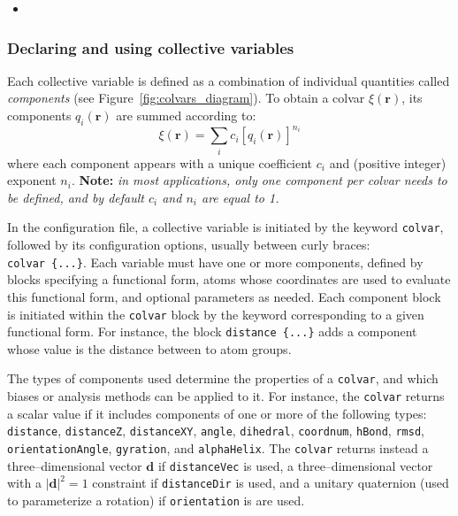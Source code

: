 \begin{itemize}
\item %

\end{itemize}



\subsubsection{Declaring and using collective variables}
\label{sec:colvar}

Each collective variable is defined as a combination of
individual quantities called \emph{components}
(see Figure~\ref{fig:colvars_diagram}). To obtain a colvar $\xi(\mathbf{r})$,
its components $q_i(\mathbf{r})$ are summed according to:
\begin{equation}
  \label{eq:colvar_combination}
  \xi(\mathbf{r}) = \sum_i c_i [q_i(\mathbf{r})]^{n_i}
\end{equation}
where each component appears with a unique coefficient $c_i$ and
(positive integer) exponent $n_i$.  \textbf{Note:} \emph{in most
  applications, only one component per colvar needs to be defined, and
  by default $c_i$ and $n_i$ are equal to 1.}

In the configuration file, a collective variable is initiated
by the keyword \texttt{colvar},
followed by its configuration options, usually between curly braces:
\texttt{colvar~\{...\}}. Each variable must
have one or more components, defined by blocks specifying a
functional form, atoms whose coordinates are used to evaluate
this functional form, and optional parameters as needed. Each
component block is initiated within the \texttt{colvar} block by the
keyword corresponding to a given functional form.  For instance, the
block \texttt{distance \{...\}} adds a component whose value is
the distance between to atom groups.

The types of components used determine the properties of a
\texttt{colvar}, and which biases or analysis methods can be applied
to it.  For instance, the \texttt{colvar} returns a scalar value if it
includes components of one or more of the following types:
\texttt{distance}, \texttt{distanceZ}, \texttt{distanceXY},
\texttt{angle}, \texttt{dihedral}, \texttt{coordnum}, \texttt{hBond},
\texttt{rmsd}, \texttt{orientationAngle}, \texttt{gyration}, and
\texttt{alphaHelix}.  The \texttt{colvar} returns instead a
three--dimensional vector $\mathbf{d}$ if \texttt{distanceVec} is
used, a three--dimensional vector with a $|\mathbf{d}|^2 = 1$
constraint if \texttt{distanceDir} is used, and a unitary quaternion
(used to parameterize a rotation) if \texttt{orientation} is are used.

